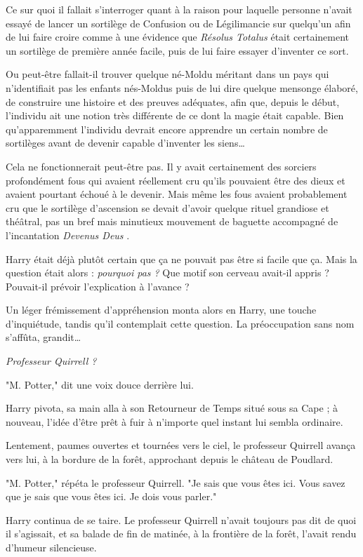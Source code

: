 Ce sur quoi il fallait s'interroger quant à la raison pour laquelle personne n'avait essayé de lancer un sortilège de Confusion ou de Légilimancie sur quelqu'un afin de lui faire croire comme à une évidence que \emph{Résolus Totalus}  était certainement un sortilège de première année facile, puis de lui faire essayer d'inventer ce sort.

Ou peut-être fallait-il trouver quelque né-Moldu méritant dans un pays qui n'identifiait pas les enfants nés-Moldus puis de lui dire quelque mensonge élaboré, de construire une histoire et des preuves adéquates, afin que, depuis le début, l'individu ait une notion très différente de ce dont la magie était capable. Bien qu'apparemment l'individu devrait encore apprendre un certain nombre de sortilèges avant de devenir capable d'inventer les siens…

Cela ne fonctionnerait peut-être pas. Il y avait certainement des sorciers profondément fous qui avaient réellement cru qu'ils pouvaient être des dieux et avaient pourtant échoué à le devenir. Mais même les fous avaient probablement cru que le sortilège d'ascension se devait d'avoir quelque rituel grandiose et théâtral, pas un bref mais minutieux mouvement de baguette accompagné de l'incantation \emph{Devenus Deus} .

Harry était déjà plutôt certain que ça ne pouvait pas être si facile que ça. Mais la question était alors : \emph{pourquoi pas ?}  Que motif son cerveau avait-il appris ? Pouvait-il prévoir l'explication à l'avance ?

Un léger frémissement d'appréhension monta alors en Harry, une touche d'inquiétude, tandis qu'il contemplait cette question. La préoccupation sans nom s'affûta, grandit…

\emph{Professeur Quirrell ?} 

"M. Potter," dit une voix douce derrière lui.

Harry pivota, sa main alla à son Retourneur de Temps situé sous sa Cape ; à nouveau, l'idée d'être prêt à fuir à n'importe quel instant lui sembla ordinaire.

Lentement, paumes ouvertes et tournées vers le ciel, le professeur Quirrell avança vers lui, à la bordure de la forêt, approchant depuis le château de Poudlard.

"M. Potter," répéta le professeur Quirrell. "Je sais que vous êtes ici. Vous savez que je sais que vous êtes ici. Je dois vous parler."

Harry continua de se taire. Le professeur Quirrell n'avait toujours pas dit de quoi il s'agissait, et sa balade de fin de matinée, à la frontière de la forêt, l'avait rendu d'humeur silencieuse.


